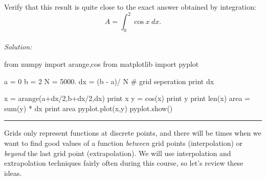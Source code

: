 \begin{enumerate}
\begin{enumerate}
    Verify that this result is quite close to the exact
    answer obtained by integration:
    \[
        A=\int_0^2 \cos{x} ~dx.
    \]\\
\ifsolutions
\textit{Solution:}\\
\begin{codeexample}
\begin{VerbatimOut}{\listingFile}
from numpy import arange,cos
from matplotlib import pyplot

a = 0
b = 2
N = 5000.
dx = (b  - a)/ N  # grid seperation
print dx

x = arange(a+dx/2,b+dx/2,dx)
print x
y = cos(x)
print y
print len(x)
area = sum(y) * dx
print area
pyplot.plot(x,y)
pyplot.show()
\end{VerbatimOut}
\end{codeexample}
\else
\noindent\rule{4 in}{0.01 in}
\fi
{}

\end{enumerate}
\end{enumerate}


 

Grids only represent functions at discrete points, and there will be
times when we want to find good values of a function {\it between}
grid points (interpolation) or \emph{beyond} the last grid point
(extrapolation). We will use interpolation and extrapolation
techniques fairly often during this course, so let's review these
ideas.


